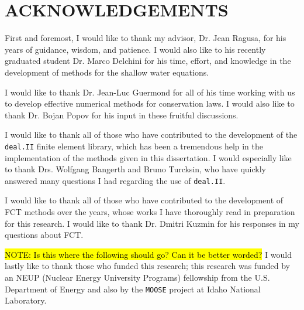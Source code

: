 \chapter*{ACKNOWLEDGEMENTS}

\indent
First and foremost, I would like to thank my advisor, Dr. Jean Ragusa,
for his years of guidance, wisdom, and patience. I would also like to his
recently graduated student Dr. Marco Delchini for his time, effort, and
knowledge in the development of methods for the shallow water equations.

I would like to thank Dr. Jean-Luc Guermond for all of his time working
with us to develop effective numerical methods for conservation laws.
I would also like to thank Dr. Bojan Popov for his input in these
fruitful discussions.

I would like to thank all of those who have contributed to the
development of the \texttt{deal.II} finite element library, which has been
a tremendous help in the implementation of the methods given in this
dissertation. I would especially like to thank Drs. Wolfgang Bangerth
and Bruno Turcksin, who have quickly answered many questions I had regarding
the use of \texttt{deal.II}.

I would like to thank all of those who have contributed to the development
of FCT methods over the years, whose works I have thoroughly read in
preparation for this research. I would like to thank Dr. Dmitri Kuzmin
for his responses in my questions about FCT.

\hl{NOTE: Is this where the following should go? Can it be better worded?}
I would lastly like to thank those who funded this research;
this research was funded by an NEUP (Nuclear Energy University Programs)
fellowship from the U.S. Department of Energy and also by the \texttt{MOOSE}
project at Idaho National Laboratory.

\pagebreak{}
